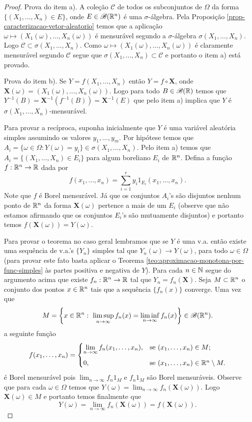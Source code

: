 \begin{proof}
Prova do item a). 
A coleção $\mathcal{C}$ de todos os subconjuntos 
de $\Omega$ da forma 
$\{(X_1,\ldots,X_n)\in E\}$, onde $E\in\mathscr{B}(\mathbb{R}^n)$
é uma $\sigma$-álgebra. 
Pela Proposição \ref{prop-caracterizacao-vetor-aleatorio}
temos que a aplicação $\omega\mapsto (X_1(\omega),\ldots,X_n(\omega))$
é mensurável segundo a $\sigma$-álgebra $\sigma(X_1,\ldots,X_n)$.
Logo $\mathcal{C}\subset \sigma(X_1,\ldots,X_n)$. 
Como $\omega\mapsto (X_1(\omega),\ldots,X_n(\omega))$ é claramente 
mensurável segundo $\mathcal{C}$ segue que 
$\sigma(X_1,\ldots,X_n)\subset\mathcal{C}$ e portanto o 
item a) está provado.


Prova do item b).
Se $Y=f(X_1,\ldots,X_n)$ então $Y=f\circ \mathbf{X}$,
onde $\mathbf{X}(\omega)=(X_1(\omega),\ldots,X_n(\omega))$.
Logo para todo $B\in\mathscr{B}(\mathbb{R})$ temos que 
$Y^{-1}(B)= \mathbf{X}^{-1}(f^{-1}(B))= \mathbf{X}^{-1}(E)$
que pelo item a) implica que $Y$ 
é $\sigma(X_1,\ldots,X_n)$-mensurável.


Para provar a recíproca, suponha inicialmente 
que $Y$ é uma variável aleatória simples assumindo 
os valores $y_1,\ldots,y_m$. Por hipótese temos que 
$
A_i
=
\{\omega\in\Omega: Y(\omega)=y_i\}
\in 
\sigma(X_1,\ldots,X_n).
$
Pelo item a) temos que $A_i=\{(X_1,\ldots,X_n)\in E_i\}$ 
para algum boreliano $E_i$ de $\mathbb{R}^n$. Defina a função 
$f:\mathbb{R}^n\to\mathbb{R}$ dada por 
	\[
	f(x_1,\ldots,x_n)=\sum_{i=1}^r y_i 1_{E_i}(x_1,\ldots,x_n).
	\]
Note que $f$ é Borel mensurável. 
Já que os conjuntos $A_i$'s são disjuntos nenhum ponto 
de $\mathbb{R}^n$ da forma $\mathbf{X}(\omega)$ pertence a mais 
de um $E_i$ 
(observe que não estamos afirmando que os conjuntos 
$E_i$'s são mutuamente disjuntos)
e portanto temos $f(\mathbf{X}(\omega))=Y(\omega)$.


Para provar o teorema no caso geral lembramos que 
se $Y$ é uma v.a. então 
existe uma sequência de v.a.'s $\{Y_n\}$ simples
tal que $Y_n(\omega)\to Y(\omega)$, 
para todo $\omega\in\Omega$
(para provar este fato basta aplicar 
o Teorema \ref{teo:aproximacao-monotona-por-func-simples}
às partes positiva e negativa de $Y$).
Para cada $n\in\mathbb{N}$ segue do argumento acima que 
existe $f_n:\mathbb{R}^n\to\mathbb{R}$ tal que $Y_n=f_n(\mathbf{X})$.
Seja $M\subset \mathbb{R}^n$ o conjunto dos pontos $x\in\mathbb{R}^n$ 
tais que a sequência $\{f_n(x)\}$ converge.
Uma vez que 
 \[
 	M
 	=
 	\left\{
 		x\in\mathbb{R}^n:\ \limsup_{n\to\infty}f_n(x)=\liminf_{n\to\infty}f_n(x)
 	\right\}\in \mathscr{B}(\mathbb{R}^n).
 \]
a seguinte função  
	\[
	f(x_1,\ldots,x_n)
	=
	\begin{cases}
	\displaystyle
	\lim_{n\to\infty} f_n(x_1,\ldots,x_n),& \text{se}\ (x_1,\ldots,x_n)\in M;
	\\[0.3cm]
	0,&\text{se}\ (x_1,\ldots,x_n)\in \R^n\setminus M.
	\end{cases}
	\]
é Borel mensurável pois $\lim_{n\to\infty} f_n1_{M}$ e $f_n1_{M}$ são 
Borel mensuráveis.
Observe que para cada $\omega\in\Omega$ temos que 
$Y(\omega)=\lim_{n\to\infty} f_n(\mathbf{X}(\omega))$.
Logo $\mathbf{X}(\omega)\in M$ e portanto temos finalmente
que 
	\[
	Y(\omega) 
	=
	\lim_{n\to\infty} f_n(\mathbf{X}(\omega))
	=
	f(\mathbf{X}(\omega)).
	\] 
\end{proof}

